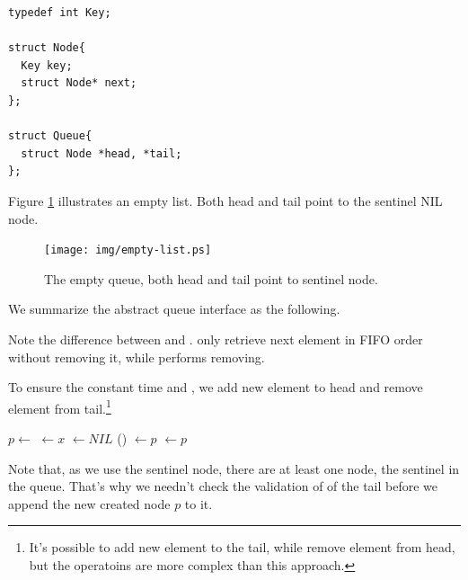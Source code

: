 \documentclass{article}
\begin{document}
\lstset{language=C}
\begin{lstlisting}
typedef int Key;

struct Node{
  Key key;
  struct Node* next;
};

struct Queue{
  struct Node *head, *tail;
};
\end{lstlisting}

Figure \ref{fig:empty-list} illustrates an empty list. Both head
and tail point to the sentinel NIL node.

\begin{figure}[htbp]
  \centering
  \texttt{[image: img/empty-list.ps]}
  \caption{The empty queue, both head and tail point to sentinel node.} \label{fig:empty-list}
\end{figure}

We summarize the abstract queue interface as the following.

\begin{algorithmic}
\EndFunction
{}
\EndFunction
{}
\EndFunction
{}
\EndFunction
{}
\EndFunction
\end{algorithmic}

Note the difference between  and .
 only retrieve next element in FIFO order without removing
it, while  performs removing.

To ensure the constant time  and ,
we add new element to head and remove element from tail.\footnote{It's possible
to add new element to the tail, while remove element from head, but the 
operatoins are more complex than this approach.}

\begin{algorithmic}
  \State $p \gets $ 
  \State {} $\gets x$
  \State {} $\gets NIL$
  \State {}() $\gets p$
  \State {} $\gets p$
\EndFunction
\end{algorithmic}

Note that, as we use the sentinel node, there are at least one node, the
sentinel in the queue. That's why we needn't check the validation of
of the tail before we append the new created node $p$ to it.
\end{document}
